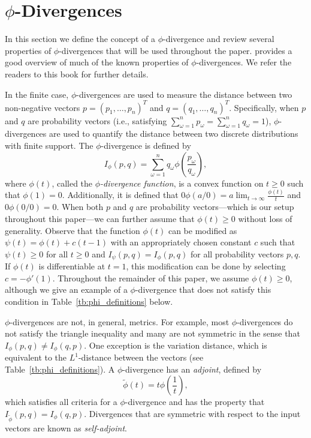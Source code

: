 \documentclass[opre,nonblindrev]{informs3} %
\begin{document}
\section{$\phi$-Divergences} %
\label{sec:phi_divergences}

In this section we define the concept of a $\phi$-divergence and review several properties of  $\phi$-divergences that will be used throughout the paper. 
\citet{pardo2005statistical} provides a good overview of much of the known properties of $\phi$-divergences. 
We refer the readers to this book for further details.

In the finite case, $\phi$-divergences are used to measure the distance between two non-negative vectors $p = (p_1, \dots, p_n)^T$ and $q = (q_1, \dots, q_n)^T$.
Specifically, when $p$ and $q$ are probability vectors (i.e., satisfying $\sum_{\omega=1}^n p_\omega = \sum_{\omega=1}^n q_\omega = 1$), $\phi$-divergences are used to quantify the distance between two discrete distributions with finite support. 
The $\phi$-divergence is defined by
\[
	I_\phi(p,q) = \sum_{\omega=1}^n q_\omega \phi\left(\frac{p_\omega}{q_\omega}\right),
\]
where $\phi(t)$, called the {\it $\phi$-divergence function}, is a convex function on $t \geq 0$ such that $\phi(1) = 0$.
Additionally, it is defined that $0 \phi(a/0) = a \lim_{t \rightarrow \infty} \frac{\phi(t)}{t}$ and $0 \phi(0/0) = 0$.
When both $p$ and $q$ are probability vectors---which is our setup throughout this paper---we can further assume that $\phi(t) \geq 0$ without loss of generality.
Observe that the function $\phi(t)$ can be modified as $\psi(t) = \phi(t) + c(t-1)$ with an appropriately chosen constant $c$ such that $\psi(t) \geq 0$ for all $t\geq 0$ and $I_\psi(p,q) = I_\phi(p,q)$ for all probability vectors $p,q$.
If $\phi(t)$ is differentiable at $t = 1$, this modification can be done by selecting $c = -\phi'(1)$.
Throughout the remainder of this paper, we assume $\phi(t) \geq 0$, although we give an example of a $\phi$-divergence that does not satisfy this condition in Table~\ref{tb:phi_definitions} below. 

$\phi$-divergences are not, in general, metrics.
For example, most $\phi$-divergences do not satisfy the triangle inequality and many are not symmetric in the sense that $I_\phi(p,q) \neq I_\phi(q,p)$.
One exception is the variation distance, which is equivalent to the $L^1$-distance between the vectors (see Table~\ref{tb:phi_definitions}).
A $\phi$-divergence has an {\it adjoint}, defined by
\begin{equation} \label{eq:adjoint}
	\tilde{\phi}(t) = t \phi\left(\frac{1}{t}\right),
\end{equation}
which satisfies all criteria for a $\phi$-divergence \citep{bental1991certainty} and has the property that $I_{\tilde{\phi}}(p,q) = I_\phi(q,p)$.
Divergences that are symmetric with respect to the input vectors are known as {\it self-adjoint}.
\end{document}
